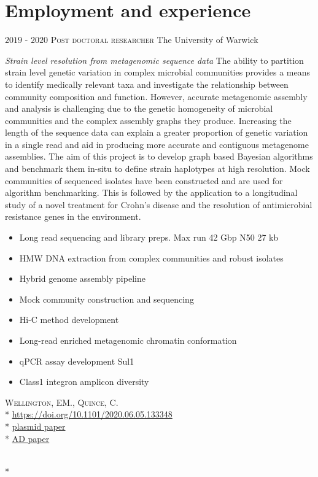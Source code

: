 \documentclass[hidelinks]{james-cv} %
\begin{document}
\section{Employment and experience}
\begin{entrylist}
\entry
{$2019$ - $2020$}
{\textsc{Post doctoral researcher}}
{The University of Warwick}
{\bodyfontsc\color{gray}{Strains and genomes:} \emph{Strain level resolution from metagenomic sequence data} 
\color{gray}\normalsize\thinfont The ability to partition strain level genetic variation in complex microbial communities provides a means to identify medically relevant taxa and investigate the relationship between community composition and function. However, accurate metagenomic assembly and analysis is challenging due to the genetic homogeneity of microbial communities and the complex assembly graphs they produce. Increasing the length of the sequence data can explain a greater proportion of genetic variation in a single read and aid in producing more accurate and contiguous metagenome assemblies. The aim of this project is to develop graph based Bayesian algorithms and benchmark them in-situ to define strain haplotypes at high resolution. Mock communities of sequenced isolates have been constructed and are used for algorithm benchmarking. This is followed by the application to a longitudinal study of a novel treatment for Crohn's disease and the resolution of antimicrobial resistance genes in the environment.           
\begin{itemize}
\item Long read sequencing and library preps. Max run 42 Gbp N50 27 kb
\item HMW DNA extraction from complex communities and robust isolates
\item Hybrid genome assembly pipeline
\item Mock community construction and sequencing
\item Hi-C method development
\item Long-read enriched metagenomic chromatin conformation 
\item qPCR assay development Sul1
\item Class1 integron amplicon diversity
\end{itemize}  
\bodyfontsc{}\textsc{Wellington, EM., Quince, C.}\\*
\bodyfontsc{}\thinfont\color{blue}\href{https://www.biorxiv.org/content/10.1101/2020.06.05.133348v1}{https://doi.org/10.1101/2020.06.05.133348}\\*
\bodyfontsc\nolinebreak\color{gray}{DOI: }\thinfont\color{blue}\href{https://www.biorxiv.org/content/10.1101/2020.06.05.133348v1}{plasmid paper}\\*
\bodyfontsc\nolinebreak\color{gray}{DOI: }\thinfont\color{blue}\href{https://www.biorxiv.org/content/10.1101/2020.06.05.133348v1}{AD paper}}\\*
\end{entrylist}
\end{document}
